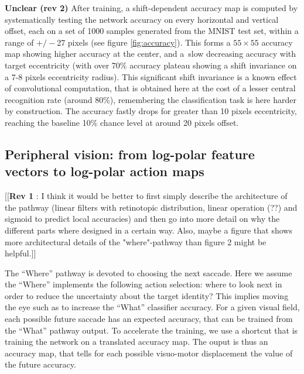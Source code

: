 {\color{red} \textbf{Unclear (rev 2)} After training, a shift-dependent accuracy map is computed by systematically testing the network accuracy on every horizontal and vertical offset, each on a set of 1000 samples generated from the MNIST test set, within a range of $+/-$27 pixels (see figure \ref{fig:accuracy}).  This forms a $55\times 55$ accuracy map showing higher accuracy at the center, and a slow decreasing accuracy with target eccentricity (with over 70\% accuracy plateau showing a shift invariance on a 7-8 pixels eccentricity radius)}. This significant shift invariance is a known effect of convolutional computation, that is obtained here at the cost of a lesser central recognition rate (around 80\%), remembering the classification task is here harder by construction. The accuracy fastly drops for greater than 10 pixels eccentricity, reaching the baseline 10\% chance level at around 20 pixels offset. 




\subsection*{Peripheral vision: from log-polar feature vectors to log-polar action maps}
%
%
%
{\color{magenta} [[\textbf{Rev 1} : I think it would be better to first simply describe the architecture of the pathway (linear filters with retinotopic distribution, linear operation (??) and sigmoid to predict local accuracies) and then go into more detail on why the different parts where designed in a certain way. Also, maybe a figure that shows more architectural details of the "where"-pathway than figure 2 might be helpful.]]}

The ``Where'' pathway is devoted to choosing the next saccade. 
Here we assume the ``Where'' implements the following action selection: where to look next in order to reduce the uncertainty about the target identity? This implies moving the eye such as to increase the ``What'' classifier accuracy. For a given visual field, each possible future saccade has an expected accuracy, that can be trained from the ``What'' pathway output. To accelerate the training, we use a shortcut that is training the network on a translated accuracy map. The ouput is thus an accuracy map, that tells for each possible visuo-motor displacement the value of the future accuracy.

